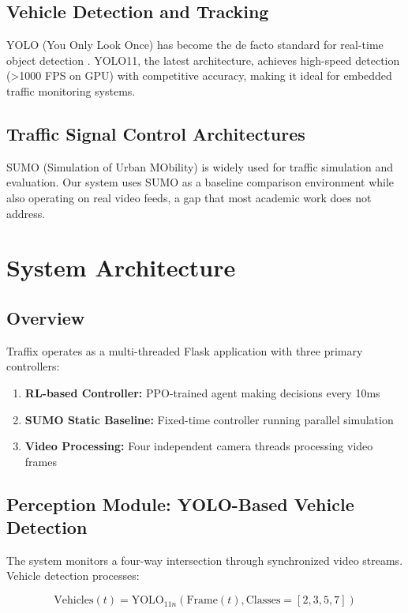 \documentclass[10pt,conference]{IEEEtran}
\begin{document}
\subsection{Vehicle Detection and Tracking}
YOLO (You Only Look Once) has become the de facto standard for real-time object detection \cite{redmon2016you}. YOLO11, the latest architecture, achieves high-speed detection (>1000 FPS on GPU) with competitive accuracy, making it ideal for embedded traffic monitoring systems.

\subsection{Traffic Signal Control Architectures}
SUMO (Simulation of Urban MObility) \cite{krajzewicz2012recent} is widely used for traffic simulation and evaluation. Our system uses SUMO as a baseline comparison environment while also operating on real video feeds, a gap that most academic work does not address.

\section{System Architecture}

\subsection{Overview}
Traffix operates as a multi-threaded Flask application with three primary controllers:
\begin{enumerate}
    \item \textbf{RL-based Controller:} PPO-trained agent making decisions every 10ms
    \item \textbf{SUMO Static Baseline:} Fixed-time controller running parallel simulation
    \item \textbf{Video Processing:} Four independent camera threads processing video frames
\end{enumerate}

\subsection{Perception Module: YOLO-Based Vehicle Detection}

The system monitors a four-way intersection through synchronized video streams. Vehicle detection processes:

\begin{equation}
\text{Vehicles}(t) = \text{YOLO}_{11n}(\text{Frame}(t), \text{Classes}=[2,3,5,7])
\end{equation}
\end{document}

